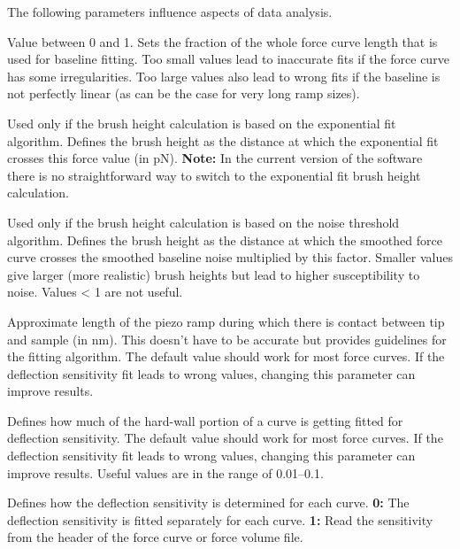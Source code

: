 \documentclass[12pt,a4paper]{article}
\begin{document}
The following parameters influence aspects of data analysis.
\begin{description}[style=nextline]

\item[ksBaselineFitLength]
Value between 0 and 1. Sets the fraction of the whole force curve length that is used for baseline fitting. Too small values lead to inaccurate fits if the force curve has some irregularities. Too large values also lead to wrong fits if the baseline is not perfectly linear (as can be the case for very long ramp sizes).

\item[ksBrushCutoff]
Used only if the brush height calculation is based on the exponential fit algorithm. Defines the brush height as the distance at which the exponential fit crosses this force value (in \si{pN}). \textbf{Note:} In the current version of the software there is no straightforward way to switch to the exponential fit brush height calculation.

\item[ksBrushOverNoise]
Used only if the brush height calculation is based on the noise threshold algorithm. Defines the brush height as the distance at which the smoothed force curve crosses the smoothed baseline noise multiplied by this factor. Smaller values give larger (more realistic) brush heights but lead to higher susceptibility to noise. Values \num{< 1} are not useful.

\item[ksDeflSens\_ContactLen]
Approximate length of the piezo ramp during which there is contact between tip and sample (in nm). This doesn't have to be accurate but provides guidelines for the fitting algorithm. The default value should work for most force curves. If the deflection sensitivity fit leads to wrong values, changing this parameter can improve results.

\item[ksDeflSens\_EdgeFraction]
Defines how much of the hard-wall portion of a curve is getting fitted for deflection sensitivity. The default value should work for most force curves. If the deflection sensitivity fit leads to wrong values, changing this parameter can improve results. Useful values are in the range of \numrange{0.01}{0.1}.

\item[ksFixDefl]
Defines how the deflection sensitivity is determined for each curve. \textbf{0:} The deflection sensitivity is fitted separately for each curve. \textbf{1:} Read the sensitivity from the header of the force curve or force volume file.


\end{description}
\end{document}
